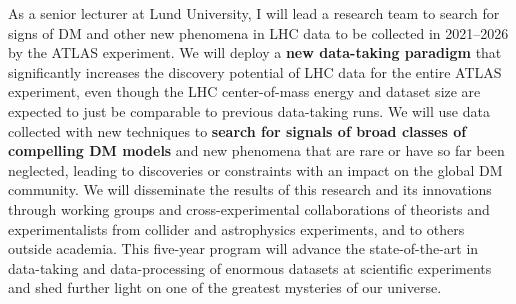 As a senior lecturer at Lund University, I will lead a research team to search for signs of DM and other new phenomena in LHC data to be collected in 2021--2026 by the ATLAS experiment. 
We will deploy a \textbf{new data-taking paradigm} that significantly increases the discovery potential of LHC data for the entire ATLAS experiment, 
even though the LHC center-of-mass energy and dataset size are expected to just be comparable to previous data-taking runs. 
We will use data collected with new techniques to \textbf{search for signals of broad classes of compelling DM models} and new phenomena that are rare or have so far been neglected, leading to discoveries or constraints with an impact on the global DM community.  
We will disseminate the results of this research and its innovations through working groups and cross-experimental collaborations of theorists and experimentalists from collider and astrophysics experiments, and to others outside academia. 
This five-year program will advance the state-of-the-art in data-taking and data-processing of enormous datasets at scientific experiments and shed further light on one of the greatest mysteries of our universe. 



